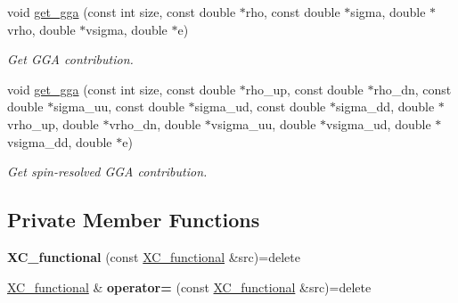 \begin{DoxyCompactItemize}
\item 
void \hyperlink{classsirius_1_1_x_c__functional_ad4945196b8d6859f989e00a88f57e5b1}{get\+\_\+gga} (const int size, const double $\ast$rho, const double $\ast$sigma, double $\ast$vrho, double $\ast$vsigma, double $\ast$e)
\begin{DoxyCompactList}\small\item\em Get G\+G\+A contribution. \end{DoxyCompactList}\item 
void \hyperlink{classsirius_1_1_x_c__functional_ad0e21ef4e2cba8653c17bfe797dcafb9}{get\+\_\+gga} (const int size, const double $\ast$rho\+\_\+up, const double $\ast$rho\+\_\+dn, const double $\ast$sigma\+\_\+uu, const double $\ast$sigma\+\_\+ud, const double $\ast$sigma\+\_\+dd, double $\ast$vrho\+\_\+up, double $\ast$vrho\+\_\+dn, double $\ast$vsigma\+\_\+uu, double $\ast$vsigma\+\_\+ud, double $\ast$vsigma\+\_\+dd, double $\ast$e)
\begin{DoxyCompactList}\small\item\em Get spin-\/resolved G\+G\+A contribution. \end{DoxyCompactList}\end{DoxyCompactItemize}
\subsection*{Private Member Functions}
\begin{DoxyCompactItemize}
\item 
\hypertarget{classsirius_1_1_x_c__functional_a55ba3b8bd39d6c666f66c4e1ebf1b950}{}{\bfseries X\+C\+\_\+functional} (const \hyperlink{classsirius_1_1_x_c__functional}{X\+C\+\_\+functional} \&src)=delete\label{classsirius_1_1_x_c__functional_a55ba3b8bd39d6c666f66c4e1ebf1b950}

\item 
\hypertarget{classsirius_1_1_x_c__functional_a75a54ff1e0cefd762b4ee73e9284e878}{}\hyperlink{classsirius_1_1_x_c__functional}{X\+C\+\_\+functional} \& {\bfseries operator=} (const \hyperlink{classsirius_1_1_x_c__functional}{X\+C\+\_\+functional} \&src)=delete\label{classsirius_1_1_x_c__functional_a75a54ff1e0cefd762b4ee73e9284e878}

\end{DoxyCompactItemize}
